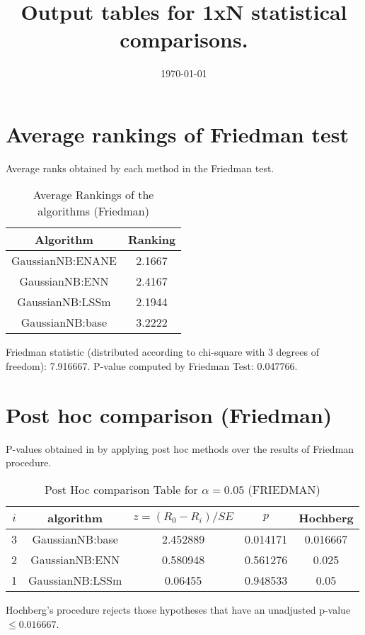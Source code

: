 \documentclass[a4paper,10pt]{article}
\title{Output tables for 1xN statistical comparisons.}
\author{}
\date{\today}
\begin{document}
\begin{landscape}
\pagestyle{empty}
\maketitle
\thispagestyle{empty}

\section{Average rankings of Friedman test}


Average ranks obtained by each method in the Friedman test.

\begin{table}[!htp]
\centering
\begin{tabular}{|c|c|}\hline
Algorithm&Ranking\\\hline
GaussianNB:ENANE&2.1667\\GaussianNB:ENN&2.4167\\GaussianNB:LSSm&2.1944\\GaussianNB:base&3.2222\\\hline\end{tabular}
\caption{Average Rankings of the algorithms (Friedman)}
\end{table}

Friedman statistic (distributed according to chi-square with 3 degrees of freedom): 7.916667. \newline P-value computed by Friedman Test: 0.047766.\newline


\newpage

\section{Post hoc comparison (Friedman)}


P-values obtained in by applying post hoc methods over the results of Friedman procedure.

\begin{table}[!htp]
\centering\footnotesize
\begin{tabular}{ccccc}
$i$&algorithm&$z=(R_0 - R_i)/SE$&$p$&Hochberg \\
\hline3&GaussianNB:base&2.452889&0.014171&0.016667\\2&GaussianNB:ENN&0.580948&0.561276&0.025\\1&GaussianNB:LSSm&0.06455&0.948533&0.05\\\hline
\end{tabular}
\caption{Post Hoc comparison Table for $\alpha=0.05$ (FRIEDMAN)}
\end{table}Hochberg's procedure rejects those hypotheses that have an unadjusted p-value $\le0.016667$.



\end{landscape}
\end{document}
